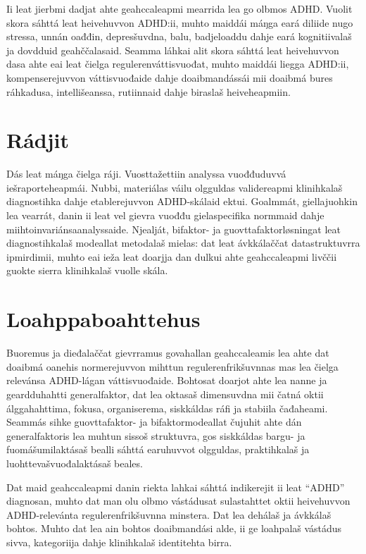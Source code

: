 \documentclass[11pt,a4paper]{article}
\begin{document}
Ii leat jierbmi dadjat ahte geahccaleapmi mearrida lea go olbmos ADHD. Vuolit skora sáhttá leat heivehuvvon ADHD:ii, muhto maiddái máŋga eará diliide nugo stressa, unnán oađđin, depresšuvdna, balu, badjeloaddu dahje eará kognitiivalaš ja dovdduid geahččalasaid. Seamma láhkai alit skora sáhttá leat heivehuvvon dasa ahte eai leat čielga regulerenváttisvuođat, muhto maiddái liegga ADHD:ii, kompenserejuvvon váttisvuođaide dahje doaibmandássái mii doaibmá bures ráhkadusa, intellišeanssa, rutiinnaid dahje biraslaš heiveheapmiin.

\section{Rádjit}
Dás leat máŋga čielga ráji. Vuosttažettiin analyssa vuođđuduvvá iešraporteheapmái. Nubbi, materiálas váilu olgguldas validereapmi klinihkalaš diagnostihka dahje etablerejuvvon ADHD-skálaid ektui. Goalmmát, giellajuohkin lea vearrát, danin ii leat vel gievra vuođđu gielaspecifika normmaid dahje miihtoinvariánsaanalyssaide. Njealját, bifaktor- ja guovttafaktorløsningat leat diagnostihkalaš modeallat metodalaš mielas: dat leat ávkkálaččat datastruktuvrra ipmirdimii, muhto eai ieža leat doarjja dan dulkui ahte geahccaleapmi livččii guokte sierra klinihkalaš vuolle skála.

\section{Loahppaboahttehus}
Buoremus ja dieđalaččat gievrramus govahallan geahccaleamis lea ahte dat doaibmá oanehis normerejuvvon mihttun regulerenfrikšuvnnas mas lea čielga relevánsa ADHD-lágan váttisvuođaide. Bohtosat doarjot ahte lea nanne ja geardduhahtti generalfaktor, dat lea oktasaš dimensuvdna mii čatná oktii álggahahttima, fokusa, organiserema, siskkáldas ráfi ja stabiila čađaheami. Seammás sihke guovttafaktor- ja bifaktormodeallat čujuhit ahte dán generalfaktoris lea muhtun sissoš struktuvra, gos siskkáldas bargu- ja fuomášumilaktásaš bealli sáhttá earuhuvvot olgguldas, praktihkalaš ja luohttevašvuođalaktásaš beales.

Dat maid geahccaleapmi danin riekta lahkai sáhttá indikerejit ii leat ``ADHD'' diagnosan, muhto dat man olu olbmo vástádusat sulastahttet oktii heivehuvvon ADHD-relevánta regulerenfrikšuvnna minstera. Dat lea dehálaš ja ávkkálaš bohtos. Muhto dat lea ain bohtos doaibmandási alde, ii ge loahpalaš vástádus sivva, kategoriija dahje klinihkalaš identitehta birra.

\printbibliography
\end{document}
